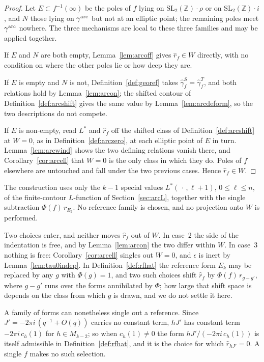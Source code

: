 \documentclass[11pt]{article}
\newcommand{\ZZ}{\mathbb{Z}}
\newcommand{\SLZ}{\mathrm{SL}_2(\ZZ)}
\begin{document}
\begin{proof}
Let $E\subset f^{-1}(\infty)$ be the poles of $f$ lying on $\SLZ\!\cdot\!\rho$ or on
$\SLZ\!\cdot\!i$, and $N$ those lying on $\gamma^{\rm arc}$ but not at an elliptic point; the
remaining poles meet $\gamma^{\rm arc}$ nowhere. The three mechanisms are local to these three
families and may be applied together.

If $E$ and $N$ are both empty, Lemma~\ref{lem:arcoff} gives $\hat r_f\in W$ directly, with no
condition on where the other poles lie or how deep they are.

If $E$ is empty and $N$ is not, Definition~\ref{def:georef} takes $\hat\gamma^S_f=\hat\gamma^T_f$,
and both relations hold by Lemma~\ref{lem:arcon}; the shifted contour of
Definition~\ref{def:arcshift} gives the same value by Lemma~\ref{lem:arcdeform}, so the two
descriptions do not compete.

If $E$ is non-empty, read $L^*$ and $\hat r_f$ off the shifted class of
Definition~\ref{def:arcshift} at $W=0$, as in Definition~\ref{def:arczero}, at each elliptic
point of $E$ in turn. Lemma~\ref{lem:arcwind} shows the two defining relations vanish there, and
Corollary~\ref{cor:arcell} that $W=0$ is the only class in which they do. Poles of $f$ elsewhere
are untouched and fall under the two previous cases. Hence $\hat r_f\in W$.
\end{proof}

The construction uses only the $k-1$ special values $L^*(\,\cdot\,,\ell+1)$, $0\le\ell\le n$, of
the finite-contour $L$-function of Section~\ref{sec:arcL}, together with the single subtraction
$\Phi(f)\,r_{E_k}$. No reference family is chosen, and no projection onto $W$ is performed.

Two choices enter, and neither moves $\hat r_f$ out of $W$. In case~2 the side of the indentation
is free, and by Lemma~\ref{lem:arcon} the two differ within $W$. In case~3 nothing is free:
Corollary~\ref{cor:arcell} singles out $W=0$, and $\epsilon$ is inert by
Lemma~\ref{lem:tau0indep}. In Definition~\ref{def:rfhat} the reference
form $E_k$ may be replaced by any $g$ with $\Phi(g)=1$, and two such choices shift $\hat r_f$ by
$\Phi(f)\,r_{g-g'}$, where $g-g'$ runs over the forms annihilated by $\Phi$; how large that shift
space is depends on the class from which $g$ is drawn, and we do not settle it here.

A family of forms can nonetheless single out a reference. Since $J'=-2\pi i\,(q^{-1}+O(q))$ carries
no constant term, $hJ'$ has constant term $-2\pi i\,c_h(1)$ for $h\in M_{k-2}$; so when
$c_h(1)\ne0$ the form $hJ'/(-2\pi i\,c_h(1))$ is itself admissible in
Definition~\ref{def:rfhat}, and it is the choice for which $\hat r_{hJ'}=0$. A single $f$ makes no
such selection.
\end{document}
